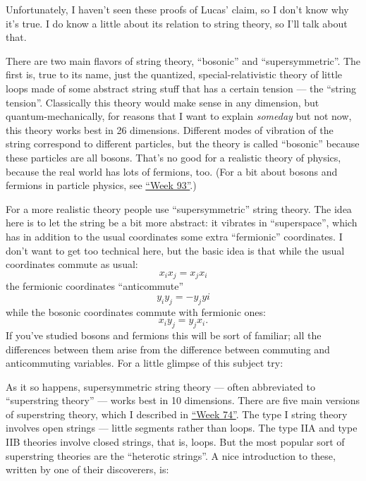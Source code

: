\documentclass{article}
\def\tightlist{}
\renewcommand{\texttt}[1]{%
  \begingroup
  \ttfamily
  \begingroup\lccode`~=`/\lowercase{\endgroup\def~}{/\discretionary{}{}{}}%
  \begingroup\lccode`~=`[\lowercase{\endgroup\def~}{[\discretionary{}{}{}}%
  \begingroup\lccode`~=`.\lowercase{\endgroup\def~}{.\discretionary{}{}{}}%
  \catcode`/=\active\catcode`[=\active\catcode`.=\active
  \scantokens{#1\noexpand}%
  \endgroup
}
\begin{document}
Unfortunately, I haven't seen these proofs of Lucas' claim, so I don't
know why it's true. I do know a little about its relation to string
theory, so I'll talk about that.

There are two main flavors of string theory, ``bosonic'' and
``supersymmetric''. The first is, true to its name, just the quantized,
special-relativistic theory of little loops made of some abstract string
stuff that has a certain tension --- the ``string tension''. Classically
this theory would make sense in any dimension, but quantum-mechanically,
for reasons that I want to explain \emph{someday} but not now, this
theory works best in 26 dimensions. Different modes of vibration of the
string correspond to different particles, but the theory is called
``bosonic'' because these particles are all bosons. That's no good for a
realistic theory of physics, because the real world has lots of
fermions, too. (For a bit about bosons and fermions in particle physics,
see \protect\hyperlink{week93}{``Week 93''}.)

For a more realistic theory people use ``supersymmetric'' string theory.
The idea here is to let the string be a bit more abstract: it vibrates
in ``superspace'', which has in addition to the usual coordinates some
extra ``fermionic'' coordinates. I don't want to get too technical here,
but the basic idea is that while the usual coordinates commute as usual:
\[x_i x_j = x_j x_i\] the fermionic coordinates ``anticommute''
\[y_i y_j = -y_j yi\] while the bosonic coordinates commute with
fermionic ones: \[x_i y_j = y_j x_i.\] If you've studied bosons and
fermions this will be sort of familiar; all the differences between them
arise from the difference between commuting and anticommuting variables.
For a little glimpse of this subject try:


As it so happens, supersymmetric string theory --- often abbreviated to
``superstring theory'' --- works best in 10 dimensions. There are five
main versions of superstring theory, which I described in
\protect\hyperlink{week74}{``Week 74''}. The type I string theory
involves open strings --- little segments rather than loops. The type
IIA and type IIB theories involve closed strings, that is, loops. But
the most popular sort of superstring theories are the ``heterotic
strings''. A nice introduction to these, written by one of their
discoverers, is:
\end{document}
